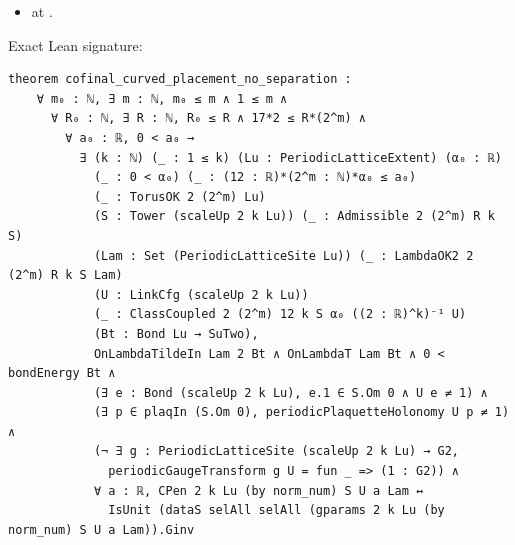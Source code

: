 \begin{theorem}[bp-066]
\begin{itemize}
\item \texttt{} at \texttt{}.
\end{itemize}
\par Exact Lean signature:
\begin{verbatim}
theorem cofinal_curved_placement_no_separation :
    ∀ m₀ : ℕ, ∃ m : ℕ, m₀ ≤ m ∧ 1 ≤ m ∧
      ∀ R₀ : ℕ, ∃ R : ℕ, R₀ ≤ R ∧ 17*2 ≤ R*(2^m) ∧
        ∀ a₀ : ℝ, 0 < a₀ →
          ∃ (k : ℕ) (_ : 1 ≤ k) (Lu : PeriodicLatticeExtent) (α₀ : ℝ)
            (_ : 0 < α₀) (_ : (12 : ℝ)*(2^m : ℕ)*α₀ ≤ a₀)
            (_ : TorusOK 2 (2^m) Lu)
            (S : Tower (scaleUp 2 k Lu)) (_ : Admissible 2 (2^m) R k S)
            (Lam : Set (PeriodicLatticeSite Lu)) (_ : LambdaOK2 2 (2^m) R k S Lam)
            (U : LinkCfg (scaleUp 2 k Lu))
            (_ : ClassCoupled 2 (2^m) 12 k S α₀ ((2 : ℝ)^k)⁻¹ U)
            (Bt : Bond Lu → SuTwo),
            OnLambdaTildeIn Lam 2 Bt ∧ OnLambdaT Lam Bt ∧ 0 < bondEnergy Bt ∧
            (∃ e : Bond (scaleUp 2 k Lu), e.1 ∈ S.Om 0 ∧ U e ≠ 1) ∧
            (∃ p ∈ plaqIn (S.Om 0), periodicPlaquetteHolonomy U p ≠ 1) ∧
            (¬ ∃ g : PeriodicLatticeSite (scaleUp 2 k Lu) → G2,
              periodicGaugeTransform g U = fun _ => (1 : G2)) ∧
            ∀ a : ℝ, CPen 2 k Lu (by norm_num) S U a Lam ↔
              IsUnit (dataS selAll selAll (gparams 2 k Lu (by norm_num) S U a Lam)).Ginv
\end{verbatim}
\end{theorem}

